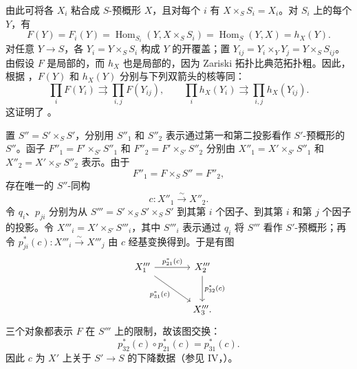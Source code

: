 由此可将各 \(X_i\) 粘合成 \(S\)-预概形 \(X\)，且对每个 \(i\) 有 \(X\times_SS_i=X_i\)。对 \(S_i\) 上的每个 \(Y\)，有
\begin{equation}
  \tag{\(\ast\)}
  F(Y)=F_i(Y)
  =\operatorname{Hom}_{S_i}(Y,X\times_SS_i)
  =\operatorname{Hom}_S(Y,X)=h_X(Y).
\end{equation}
对任意 \(Y\to S\)，各 \(Y_i=Y\times_SS_i\) 构成 \(Y\) 的开覆盖；置 \(Y_{ij}=Y_i\times_YY_j=Y\times_SS_{ij}\)。由假设 \(F\) 是局部的，而 \(h_X\) 也是局部的，因为 Zariski 拓扑比典范拓扑粗。因此，根据 ，\(F(Y)\) 和 \(h_X(Y)\) 分别与下列双箭头的核等同：
\[
  \prod_iF(Y_i)\rightrightarrows\prod_{i,j}F(Y_{ij}),
  \qquad
  \prod_ih_X(Y_i)\rightrightarrows\prod_{i,j}h_X(Y_{ij}).
\]
这证明了 。

 置 \(S''=S'\times_SS'\)，分别用 \(S''_1\) 和 \(S''_2\) 表示通过第一和第二投影看作 \(S'\)-预概形的 \(S''\)。函子 \(F''_1=F'\times_{S'}S''_1\) 和 \(F''_2=F'\times_{S'}S''_2\) 分别由 \(X''_1=X'\times_{S'}S''_1\) 和 \(X''_2=X'\times_{S'}S''_2\) 表示。由于
\[
  F''_1=F\times_SS''=F''_2,
\]
存在唯一的 \(S''\)-同构
\[
  c:X''_1\xrightarrow{\ \sim\ }X''_2.
\]
令 \(q_i\)、\(p_{ji}\) 分别为从 \(S'''=S'\times_SS'\times_SS'\) 到其第 \(i\) 个因子、到其第 \(i\) 和第 \(j\) 个因子的投影。令 \(X'''_i=X'\times_{S'}S'''_i\)，其中 \(S'''_i\) 表示通过 \(q_i\) 将 \(S'''\) 看作 \(S'\)-预概形；再令 \(p_{ji}^{*}(c):X'''_i\xrightarrow{\sim}X'''_j\) 由 \(c\) 经基变换得到。于是有图
\[
\begin{tikzcd}[column sep=large,row sep=large]
X'''_1
  \arrow[r,"p_{21}^{*}(c)"]
  \arrow[dr,"p_{31}^{*}(c)"']
&
X'''_2
  \arrow[d,"p_{32}^{*}(c)"]
\\
&X'''_3 .
\end{tikzcd}
\]
三个对象都表示 \(F\) 在 \(S'''\) 上的限制，故该图交换：
\[
  p_{32}^{*}(c)\circ p_{21}^{*}(c)=p_{31}^{*}(c).
\]
因此 \(c\) 为 \(X'\) 上关于 \(S'\to S\) 的下降数据（参见 IV，）。

